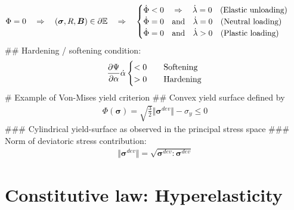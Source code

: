\documentclass[]{scrartcl}
\begin{document}
\begin{easylist}[itemize]
\begin{align*}
\Phi = 0
  \quad &\Rightarrow \quad 
  \left( \boldsymbol{\sigma},R,\boldsymbol{B} \right) \in \partial\mathbb{E}
  \quad \Rightarrow \quad
  \begin{cases}
  \dot{\Phi} < 0 \quad \Rightarrow \quad \dot{\lambda} = 0 \quad  \textnormal{(Elastic unloading)} \\
  \dot{\Phi} = 0 \quad \textnormal{and} \quad \dot{\lambda} = 0 \quad  \textnormal{(Neutral loading)} \\
  \dot{\Phi} = 0 \quad \textnormal{and} \quad \dot{\lambda} > 0 \quad  \textnormal{(Plastic loading)}
  \end{cases}
\end{align*}
## Hardening / softening condition:
\begin{align*}
\frac{\partial \Psi}{\partial \alpha} \dot{\alpha}
\begin{cases}
< 0 \quad & \textnormal{Softening} \\
> 0 \quad & \textnormal{Hardening}
\end{cases}
\end{align*}
# Example of Von-Mises yield criterion
## Convex yield surface defined by
\begin{gather*}
\Phi \left( \boldsymbol{\sigma} \right)
 = \sqrt{\frac{3}{2}} \Vert \boldsymbol{\sigma}^{dev} \Vert - \sigma_{y} 
 \leq 0
\end{gather*}
### Cylindrical yield-surface as observed in the principal stress space
### Norm of deviatoric stress contribution:
\begin{gather*}
\Vert \boldsymbol{\sigma}^{dev} \Vert
  = \sqrt{\boldsymbol{\sigma}^{dev} : \boldsymbol{\sigma}^{dev}}
\end{gather*}
\end{easylist}

\clearpage
\section{Constitutive law: Hyperelasticity}
\end{document}
